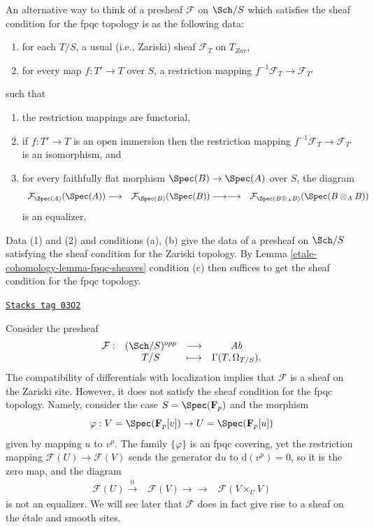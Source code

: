 An alternative way to think of a presheaf $\mathcal{F}$ on
$\Sch/S$ which satisfies the sheaf condition for the
fpqc topology is as the following data:
\begin{enumerate}
\item for each $T/S$, a usual (i.e., Zariski) sheaf $\mathcal{F}_T$ on
$T_{Zar}$,
\item for every map $f : T' \to T$ over $S$, a restriction mapping
$f^{-1}\mathcal{F}_T \to \mathcal{F}_{T'}$
\end{enumerate}
such that
\begin{enumerate}
\item[(a)] the restriction mappings are functorial,
\item[(b)] if $f : T' \to T$ is an open immersion then the restriction
mapping $f^{-1}\mathcal{F}_T \to \mathcal{F}_{T'}$ is an isomorphism, and
\item[(c)] for every faithfully flat morphism
$\Spec(B) \to \Spec(A)$ over $S$, the diagram
$$
\begin{array}{ccc}\mathcal{F}_{\Spec(A)}(\Spec(A)) \longrightarrow & \mathcal{F}_{\Spec(B)}(\Spec(B)) \longrightarrow\longrightarrow & \mathcal{F}_{\Spec(B \otimes_A B)}(\Spec(B \otimes_A B))\end{array}
$$
is an equalizer.
\end{enumerate}
Data (1) and (2) and conditions (a), (b) give the data of a presheaf
on $\Sch/S$ satisfying the sheaf condition for the Zariski topology.
By Lemma \ref{etale-cohomology-lemma-fpqc-sheaves} condition (c) then suffices to get the
sheaf condition for the fpqc topology.

\begin{example}
\label{etale-cohomology-example-quasi-coherent}
\href{https://stacks.math.columbia.edu/tag/03O2}{\texttt{Stacks tag 03O2}}

Consider the presheaf
$$
\begin{matrix}
\mathcal{F} : & (\Sch/S)^{opp} & \longrightarrow & \textit{Ab} \\
& T/S & \longmapsto & \Gamma(T, \Omega_{T/S}).
\end{matrix}
$$
The compatibility of differentials with localization implies that
$\mathcal{F}$ is a sheaf on the Zariski site.
However, it does not satisfy the sheaf condition for the fpqc topology.
Namely, consider the case
$S = \Spec(\mathbf{F}_p)$ and the morphism
$$
\varphi :
V = \Spec(\mathbf{F}_p[v])
\to
U = \Spec(\mathbf{F}_p[u])
$$
given by mapping $u$ to $v^p$. The family $\{\varphi\}$ is an fpqc covering,
yet the restriction mapping
$\mathcal{F}(U) \to \mathcal{F}(V)$
sends the generator $\text{d}u$ to $\text{d}(v^p) = 0$, so
it is the zero map, and the diagram
$$
\begin{array}{ccc}\mathcal{F}(U) \overset{0}{\longrightarrow} & \mathcal{F}(V) \longrightarrow\longrightarrow & \mathcal{F}(V \times_U V)\end{array}
$$
is not an equalizer. We will see later that $\mathcal{F}$ does in fact
give rise to a sheaf on the \'etale and smooth sites.
\end{example}

